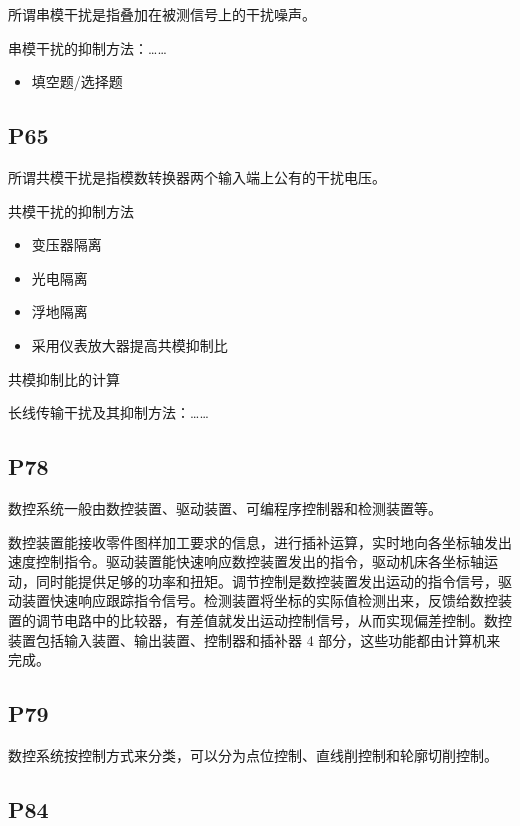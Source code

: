 \documentclass[zihao=-4
]{ctexart}%
\begin{document}
所谓串模干扰是指叠加在被测信号上的干扰噪声。

串模干扰的抑制方法：\ldots\ldots{}

\begin{itemize}
\item
  填空题/选择题
\end{itemize}

\hypertarget{header-n136}{%
\subsection{P65}\label{header-n136}}

所谓共模干扰是指模数转换器两个输入端上公有的干扰电压。

共模干扰的抑制方法

\begin{itemize}
\item
  变压器隔离
\item
  光电隔离
\item
  浮地隔离
\item
  采用仪表放大器提高共模抑制比
\end{itemize}

共模抑制比的计算

长线传输干扰及其抑制方法：\ldots\ldots{}

\hypertarget{header-n150}{%
\subsection{P78}\label{header-n150}}

数控系统一般由数控装置、驱动装置、可编程序控制器和检测装置等。

数控装置能接收零件图样加工要求的信息，进行插补运算，实时地向各坐标轴发出速度控制指令。驱动装置能快速响应数控装置发出的指令，驱动机床各坐标轴运动，同时能提供足够的功率和扭矩。调节控制是数控装置发出运动的指令信号，驱动装置快速响应跟踪指令信号。检测装置将坐标的实际值检测出来，反馈给数控装置的调节电路中的比较器，有差值就发出运动控制信号，从而实现偏差控制。数控装置包括输入装置、输出装置、控制器和插补器
4 部分，这些功能都由计算机来完成。

\hypertarget{header-n153}{%
\subsection{P79}\label{header-n153}}

数控系统按控制方式来分类，可以分为点位控制、直线削控制和轮廓切削控制。

\hypertarget{header-n155}{%
\subsection{P84}\label{header-n155}}
\end{document}
